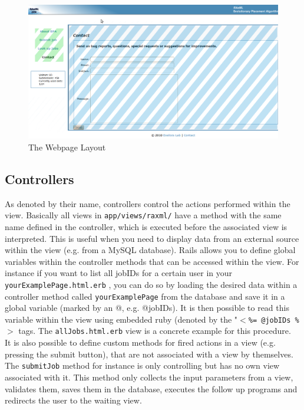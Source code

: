\documentclass{scrartcl}
\begin{document}
		\begin{figure}[htb]
		\centering
		\includegraphics[scale=0.30]{./views}
		\caption{The Webpage Layout}
		\label{fig:views}
		\end{figure}
		
		\subsection{Controllers}
		As denoted by their name, controllers control the actions performed within the view. Basically all views in  \texttt{app/views/raxml/} have a method with the same name defined in the controller, which is executed before the associated view is interpreted. This is useful when you need to display data from an external source within the view (e.g. from a MySQL database). Rails allows you to define global variables within the controller methods that can be accessed within the view. For instance if you want to list all jobIDs for a certain user in your \texttt{yourExamplePage.html.erb} , you can do so by loading the desired data within a controller method called   \texttt{yourExamplePage} from the database and save it in a global variable (marked by an @, e.g. @jobIDs). It is then possible to read this variable within the view using embedded ruby (denoted by the "\texttt{$<$\%= @jobIDs \%$>$}  tags. The \texttt{allJobs.html.erb} view is a concrete example for this  procedure. \\
		 It is also possible to define custom methods for fired actions in a view (e.g. pressing the submit button), that are not associated with a view by themselves. The \texttt{submitJob} method for instance is only controlling but has no own view associated with it. This method only collects the input parameters from a view, validates them, saves them in the database, executes the follow up programs and redirects the user to the waiting view.
		 
\end{document}
